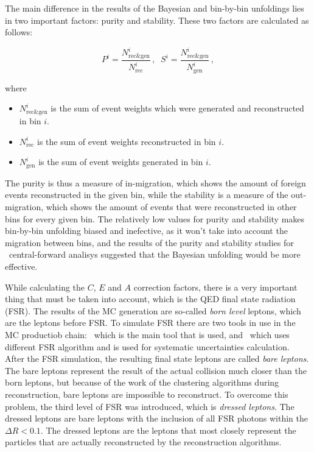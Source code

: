 The main difference in the results of the Bayesian and bin-by-bin unfoldings lies in two important factors: purity and stability. These two factors are calculated as follows:

\begin{equation}
P^{i} = \frac{N^{i}_{\text{rec\&gen}} }{ N^{i}_{\text{rec}} }\,, \; \;
S^{i} = \frac{N^{i}_{\text{rec\&gen}} }{ N^{i}_{\text{gen}} }\,,
\end{equation}

where
\begin{itemize}
\item {\bfseries $N^i_{\text{rec\&gen}}$} is the sum of event weights which were generated and reconstructed in bin $i$.
\item {\bfseries $N^i_{\text{rec}}$} is the sum of event weights reconstructed in bin $i$.
\item {\bfseries $N^i_{\text{gen}}$} is the sum of event weights generated in bin $i$.
\end{itemize}

The purity is thus a measure of in-migration, which shows the amount of foreign events reconstructed in the given bin, while the stability is a measure of the out-migration, which shows the amount of events that were reconstructed in other bins for every given bin. The relatively low values for purity and stability makes bin-by-bin unfolding biased and inefective, as it won't take into account the migration between bins, and the results of the purity and stability studies for \Zee\ central-forward analisys suggested that the Bayesian unfolding would be more effective.

While calculating the $C$, $E$ and $A$ correction factors, there is a very important thing that must be taken into account, which is the QED final state radiation (FSR). The results of the MC generation are so-called {\itshape born level} leptons, which are the leptons before FSR. To simulate FSR there are two tools in use in the MC productiob chain: \Photos\, which is the main tool that is used, and \Sherpa\ which uses different FSR algorithm and is used for systematic uncertainties calculation. After the FSR simulation, the resulting final state leptons are called {\itshape bare leptons}. The bare leptons represent the result of the actual collision much closer than the born leptons, but because of the work of the clustering algorithms during reconstruction, bare leptons are impossible to reconstruct. To overcome this problem, the third level of FSR was introduced, which is {\itshape dressed leptons}. The dressed leptons are bare leptons with the inclusion of all FSR photons within the $\Delta R < 0.1$. The dressed leptons are the leptons that most closely represent the particles that are actually reconstructed by the reconstruction algorithms.

